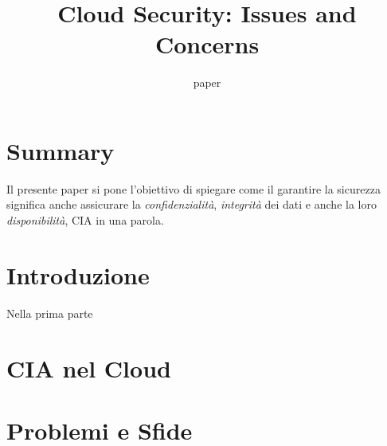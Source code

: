 \documentclass{report}
\title{Cloud Security: Issues and Concerns}
\date{paper}
\begin{document}
\maketitle

\tableofcontents

\newpage


\section{Summary}
Il presente paper si pone l'obiettivo di spiegare come il garantire la sicurezza significa anche assicurare la \textit{confidenzialità}, \textit{integrità} dei dati e anche la loro \textit{disponibilità}, CIA in una parola.

\section{Introduzione}
Nella prima parte
\section{CIA nel Cloud}

\section{Problemi e Sfide}
\end{document}
